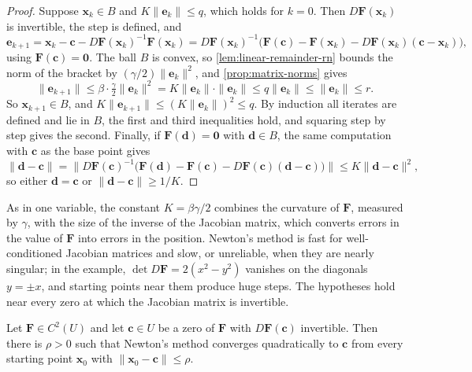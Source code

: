 \begin{proof}
Suppose $\mathbf x_k\in B$ and $K\|\mathbf e_k\|\le q$, which holds for $k=0$. Then $D\mathbf F(\mathbf x_k)$ is invertible, the step is defined, and
\[
\mathbf e_{k+1}=\mathbf x_k-\mathbf c-D\mathbf F(\mathbf x_k)^{-1}\mathbf F(\mathbf x_k)=D\mathbf F(\mathbf x_k)^{-1}\bigl(\mathbf F(\mathbf c)-\mathbf F(\mathbf x_k)-D\mathbf F(\mathbf x_k)(\mathbf c-\mathbf x_k)\bigr),
\]
using $\mathbf F(\mathbf c)=\mathbf0$. The ball $B$ is convex, so \cref{lem:linear-remainder-rn} bounds the norm of the bracket by $(\gamma/2)\|\mathbf e_k\|^2$, and \cref{prop:matrix-norms} gives
\[
\|\mathbf e_{k+1}\|\le\beta\cdot\tfrac\gamma2\|\mathbf e_k\|^2=K\|\mathbf e_k\|\cdot\|\mathbf e_k\|\le q\|\mathbf e_k\|\le\|\mathbf e_k\|\le r .
\]
So $\mathbf x_{k+1}\in B$, and $K\|\mathbf e_{k+1}\|\le(K\|\mathbf e_k\|)^2\le q$. By induction all iterates are defined and lie in $B$, the first and third inequalities hold, and squaring step by step gives the second. Finally, if $\mathbf F(\mathbf d)=\mathbf0$ with $\mathbf d\in B$, the same computation with $\mathbf c$ as the base point gives
\[
\|\mathbf d-\mathbf c\|=\bigl\|D\mathbf F(\mathbf c)^{-1}\bigl(\mathbf F(\mathbf d)-\mathbf F(\mathbf c)-D\mathbf F(\mathbf c)(\mathbf d-\mathbf c)\bigr)\bigr\|\le K\|\mathbf d-\mathbf c\|^2 ,
\]
so either $\mathbf d=\mathbf c$ or $\|\mathbf d-\mathbf c\|\ge1/K$.
\end{proof}

As in one variable, the constant $K=\beta\gamma/2$ combines the curvature of $\mathbf F$, measured by $\gamma$, with the size of the inverse of the Jacobian matrix, which converts errors in the value of $\mathbf F$ into errors in the position. Newton's method is fast for well-conditioned Jacobian matrices and slow, or unreliable, when they are nearly singular; in the example, $\det D\mathbf F=2(x^2-y^2)$ vanishes on the diagonals $y=\pm x$, and starting points near them produce huge steps. The hypotheses hold near every zero at which the Jacobian matrix is invertible.

\begin{corollary}
\label{cor:newton-n-local}
Let $\mathbf F\in C^2(U)$ and let $\mathbf c\in U$ be a zero of $\mathbf F$ with $D\mathbf F(\mathbf c)$ invertible. Then there is $\rho>0$ such that Newton's method converges quadratically to $\mathbf c$ from every starting point $\mathbf x_0$ with $\|\mathbf x_0-\mathbf c\|\le\rho$.
\end{corollary}

